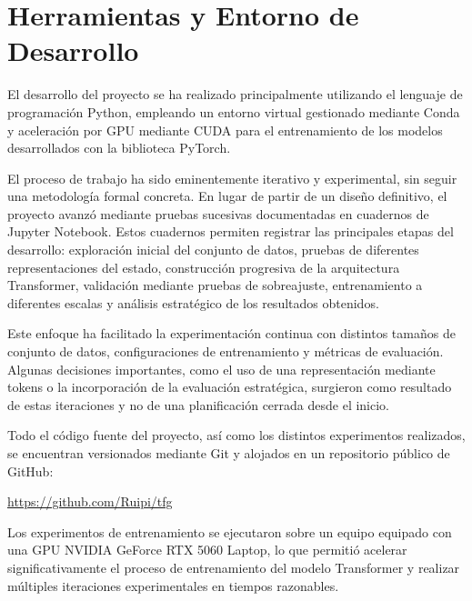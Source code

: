\section{Herramientas y Entorno de Desarrollo}

El desarrollo del proyecto se ha realizado principalmente utilizando el lenguaje de programación Python, empleando un entorno virtual gestionado mediante Conda y aceleración por GPU mediante CUDA para el entrenamiento de los modelos desarrollados con la biblioteca PyTorch.

El proceso de trabajo ha sido eminentemente iterativo y experimental, sin seguir una metodología formal concreta. En lugar de partir de un diseño definitivo, el proyecto avanzó mediante pruebas sucesivas documentadas en cuadernos de Jupyter Notebook. Estos cuadernos permiten registrar las principales etapas del desarrollo: exploración inicial del conjunto de datos, pruebas de diferentes representaciones del estado, construcción progresiva de la arquitectura Transformer, validación mediante pruebas de sobreajuste, entrenamiento a diferentes escalas y análisis estratégico de los resultados obtenidos.

Este enfoque ha facilitado la experimentación continua con distintos tamaños de conjunto de datos, configuraciones de entrenamiento y métricas de evaluación. Algunas decisiones importantes, como el uso de una representación mediante tokens o la incorporación de la evaluación estratégica, surgieron como resultado de estas iteraciones y no de una planificación cerrada desde el inicio.

Todo el código fuente del proyecto, así como los distintos experimentos realizados, se encuentran versionados mediante Git y alojados en un repositorio público de GitHub:

\begin{center}
\url{https://github.com/Ruipi/tfg}
\end{center}

Los experimentos de entrenamiento se ejecutaron sobre un equipo equipado con una GPU NVIDIA GeForce RTX 5060 Laptop, lo que permitió acelerar significativamente el proceso de entrenamiento del modelo Transformer y realizar múltiples iteraciones experimentales en tiempos razonables.

